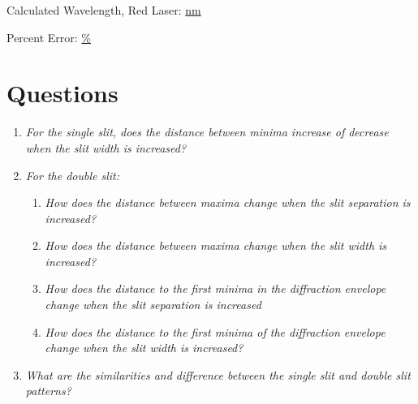\documentclass[twocolumn,english]{IEEEtran}
\theoremstyle{plain}
\theoremstyle{plain}
\begin{document}
Calculated Wavelength, Red Laser: \hfill\underline{ nm}

Percent Error: \hfill\underline{ \%}

\section{Questions}
\begin{enumerate}
	\item \textit{For the single slit, does the distance between minima increase of decrease when the slit width is increased?}

	\item \textit{For the double slit:}

	\begin{enumerate}
		\item \textit{How does the distance between maxima change when the slit separation is increased?}

		\item \textit{How does the distance between maxima change when the slit width is increased?}

		\item \textit{How does the distance to the first minima in the diffraction envelope change when the slit separation is increased}

		\item \textit{How does the distance to the first minima of the diffraction envelope change when the slit width is increased?}
	\end{enumerate}

	\item \textit{What are the similarities and difference between the single slit and double slit patterns?}
\end{enumerate}

%
%
\end{document}
